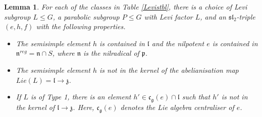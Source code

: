 \documentclass{amsart}
\newtheorem{lemma}[theorem]{Lemma}
\theoremstyle{remark}
\numberwithin{theorem}{section}
\numberwithin{equation}{section}
\begin{document}
\begin{lemma}\label{KTAblem}
For each of the classes in Table \ref{Levistbl}, there is a choice of Levi subgroup $L \leq G$, a parabolic subgroup $P \leq G$ with Levi factor $L$, and an $\mathfrak{sl}_2$-triple $(e,h,f)$ with the following properties.
\begin{itemize}
    \item[(i)] The semisimple element $h$ is contained in $\mathfrak{l}$ and the nilpotent $e$ is contained in $\mathfrak{n}^{reg} = \mathfrak{n} \cap S$, where $\mathfrak{n}$ is the nilradical of $\mathfrak{p}$.
    \item[(ii)] The semisimple element $h$ is not in the kernel of the abelianisation map $Lie(L)=\mathfrak{l} \rightarrow \mathfrak{z}$.
    \item[(iii)] If $L$ is of Type 1, there is an element $h' \in \mathfrak{c}_{\mathfrak{g}}(e) \cap \mathfrak{l}$ such that $h'$ is not in the kernel of $\mathfrak{l} \rightarrow \mathfrak{z}$. Here, $\mathfrak{c}_{\mathfrak{g}}(e)$ denotes the Lie algebra centraliser of $e$.
\end{itemize}
\end{lemma}
\end{document}
